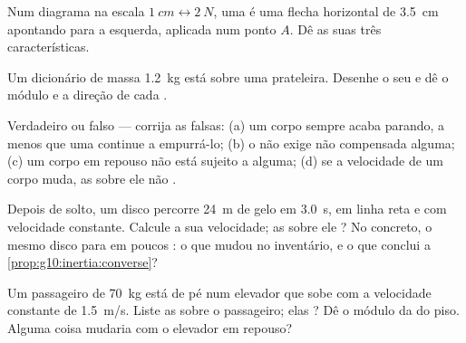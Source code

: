 \begin{exercise}[$\star$]\label{exo:g10:inertia:3}
Num diagrama na escala $\qty{1}{cm} \leftrightarrow \qty{2}{N}$, uma
 é uma flecha horizontal de \qty{3.5}{cm} apontando para a esquerda,
aplicada num ponto $A$. Dê as suas três características.
\end{exercise}

\begin{exercise}[$\star$]\label{exo:g10:inertia:4}
Um dicionário de massa \qty{1.2}{kg} está sobre uma prateleira. Desenhe o
seu  e dê o módulo e a direção de cada .
\end{exercise}

\begin{exercise}[$\star$]\label{exo:g10:inertia:5}
Verdadeiro ou falso --- corrija as falsas: (a) um corpo sempre acaba
parando, a menos que uma  continue a empurrá-lo; (b) o  não exige  não compensada alguma; (c) um corpo em
repouso não está sujeito a  alguma; (d) se a velocidade de um corpo
muda, as  sobre ele não .
\end{exercise}

\begin{exercise}[$\star\star$]\label{exo:g10:inertia:6}
Depois de solto, um disco percorre \qty{24}{m} de gelo em \qty{3.0}{s},
em linha reta e com velocidade constante. Calcule a sua velocidade; as
 sobre ele ? No concreto, o mesmo disco para em poucos
: o que mudou no inventário, e o que conclui a
\cref{prop:g10:inertia:converse}?
\end{exercise}

\begin{exercise}[$\star\star$]\label{exo:g10:inertia:7}
Um passageiro de \qty{70}{kg} está de pé num elevador que sobe com a
velocidade constante de \qty{1.5}{m/s}. Liste as  sobre o
passageiro; elas ? Dê o módulo da  do piso. Alguma coisa
mudaria com o elevador em repouso?
\end{exercise}


